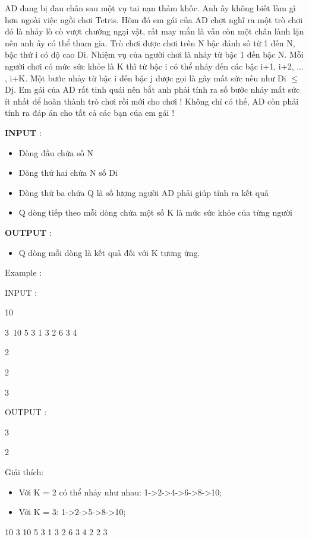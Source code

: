 



   AD đang bị đau chân sau một vụ tai nạn thảm khốc. Anh ấy không biết làm gì hơn ngoài việc ngồi chơi Tetris. Hôm đó em gái của AD chợt nghĩ ra một trò chơi đó là nhảy lò cò vượt chướng ngại vật, rất may mắn là vẫn còn một chân lành lặn nên anh ấy có thể tham gia. Trò chơi được chơi trên N bậc đánh số từ 1 đến N, bậc thứ i có độ cao Di. Nhiệm vụ của người chơi là nhảy từ bậc 1 đến bậc N. Mỗi người chơi có mức sức khỏe là K thì từ bậc i có thể nhảy đến các bậc i+1, i+2, ... , i+K. Một bước nhảy từ bậc i đến bậc j được gọi là gây mất sức nếu như Di  $\le$  Dj. Em gái của AD rất tinh quái nên bắt anh phải tính ra số bước nhảy mất sức ít nhất để hoàn thành trò chơi rồi mới cho chơi ! Không chỉ có thế, AD còn phải tính ra đáp án cho tất cả các bạn của em gái !  

\textbf{    INPUT   }   :  
\begin{itemize}
	\item     Dòng đầu chứa số N   
	\item     Dòng thứ hai chứa N số Di   
	\item     Dòng thứ ba chứa Q là số lượng người AD phải giúp tính ra kết quả   
	\item     Q dòng tiếp theo mỗi dòng chứa một số K là mức sức khỏe của từng người   
\end{itemize}

\textbf{    OUTPUT   }   :  
\begin{itemize}
	\item     Q dòng mỗi dòng là kết quả đối với K tương ứng.   
\end{itemize}

    Example      :  

INPUT   :   


   10   


   3 10 5 3 1 3 2 6 3 4   


   2   


   2   


   3  

OUTPUT   :   


   3   


   2  

   Giải thích:  
\begin{itemize}
	\item     Với K = 2 có thể nhảy như nhau: 1->2->4->6->8->10;   
	\item     Với K = 3: 1->2->5->8->10;   
\end{itemize}     10       3 10 5 3 1 3 2 6 3 4       2       2       3    

